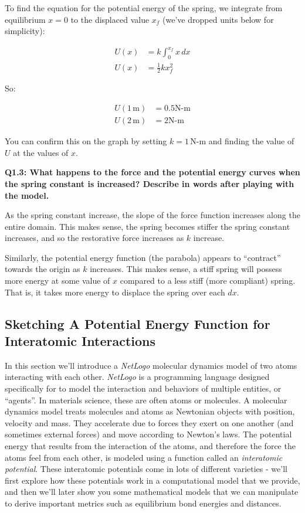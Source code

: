 \documentclass{book}
\begin{document}
To find the equation for the potential energy of the spring, we integrate from
equilibrium \(x=0\) to the displaced value \(x_f\) (we've dropped units below
for simplicity):

\begin{align*}   U(x) &= k\int_0^{x_f} x\,dx\\   U(x) &= \frac{1}{2}kx_f^2 \end{align*}

So:

\begin{align*}   U(1\,\text{m}) &= 0.5\text{N-m}\\   U(2\,\text{m}) &= 2\text{N-m} \end{align*}

You can confirm this on the graph by setting \(k=1\,\text{N-m}\) and finding
the value of \(U\) at the values of \(x\).

\textbf{Q1.3: What happens to the force and the potential energy curves when
the spring constant is increased? Describe in words after playing with the
model.}

As the spring constant increase, the slope of the force function increases
along the entire domain. This makes sense, the spring becomes stiffer the
spring constant increases, and so the restorative force increases as \(k\)
increase.

Similarly, the potential energy function (the parabola) appears to
``contract'' towards the origin as \(k\) increases. This makes sense, a stiff
spring will possess more energy at some value of \(x\) compared to a less
stiff (more compliant) spring. That is, it takes more energy to displace the
spring over each \(dx\).

\hypertarget{sketching-a-potential-energy-function-for-interatomic-interactions}{%
\subsection{Sketching A Potential Energy Function for Interatomic
Interactions}\label{sketching-a-potential-energy-function-for-interatomic-interactions}}

In this section we'll introduce a \emph{NetLogo} molecular dynamics model of
two atoms interacting with each other. \emph{NetLogo} is a programming
language designed specifically for to model the interaction and behaviors of
multiple entities, or ``agents''. In materials science, these are often atoms
or molecules. A molecular dynamics model treats molecules and atoms as
Newtonian objects with position, velocity and mass. They accelerate due to
forces they exert on one another (and sometimes external forces) and move
according to Newton's laws. The potential energy that results from the
interaction of the atoms, and therefore the force the atoms feel from each
other, is modeled using a function called an \emph{interatomic potential}.
These interatomic potentials come in lots of different varieties - we'll first
explore how these potentials work in a computational model that we provide,
and then we'll later show you some mathematical models that we can manipulate
to derive important metrics such as equilibrium bond energies and distances.
\end{document}

